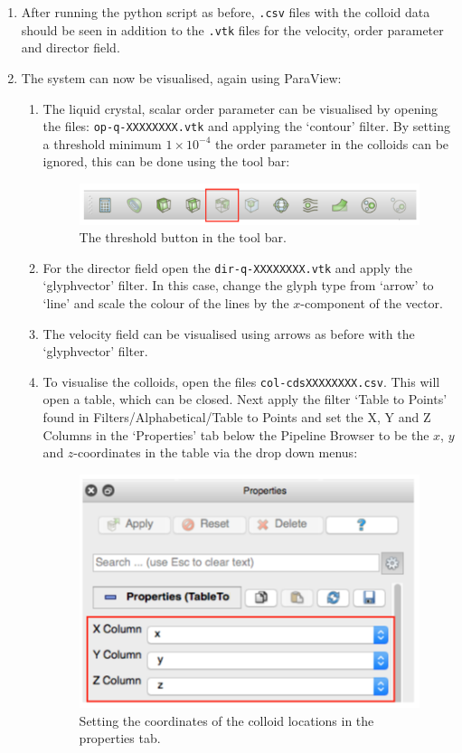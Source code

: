 \documentclass[11pt,twoside,a4paper]{article}
\begin{document}
\begin{enumerate}
\begin{enumerate}
\end{enumerate}
\item After running the python script as before, \texttt{.csv} files with the colloid data should 
be seen in addition to the \texttt{.vtk} files for the velocity, order parameter and director field.
\item The system can now be visualised, again using ParaView:
\begin{enumerate}
\item The liquid crystal, scalar order parameter can be visualised by opening the files: 
\texttt{op-q-XXXXXXXX.vtk} and applying the `contour' filter. By setting a threshold 
minimum $1 \times 10^{-4}$ the order parameter in the colloids can be ignored, this can be done using the tool bar:

\begin{figure}[H]
\begin{center}
\includegraphics[width=0.8\linewidth]{thresh.png}
  \caption{The threshold button in the tool bar.}
  \label{fig:thresh}
  \end{center}
\end{figure}

\item For the director field open the \texttt{dir-q-XXXXXXXX.vtk} and apply the `glyphvector' filter. In this case, change the glyph 
type from `arrow' to `line' and scale the colour of the lines by the $x$-component of the 
vector.
\item The velocity field can be visualised using arrows as before with the `glyphvector' filter.
\item To visualise the colloids, open the files \texttt{col-cdsXXXXXXXX.csv}. This will open 
a table, which can be closed. Next apply the filter `Table to Points' found in 
Filters/Alphabetical/Table to Points and set the X, Y and Z Columns in the `Properties' tab 
below the Pipeline Browser to be the $x$, $y$ and $z$-coordinates in the table via the 
drop down menus:

\begin{figure}[H]
\begin{center}
\includegraphics[width=0.5\linewidth]{colloidCoords.png}
  \caption{Setting the coordinates of the colloid locations in the properties tab.}
  \label{fig:collCoords}
  \end{center}
\end{figure}


\end{enumerate}
\end{enumerate}
\end{document}
